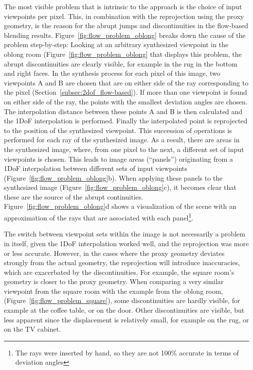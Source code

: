 The most visible problem that is intrinsic to the approach is the choice of input viewpoints per pixel. This, in combination with the reprojection using the proxy geometry, is the reason for the abrupt jumps and discontinuities in the flow-based blending results. Figure~\ref{fig:flow_problem_oblong} breaks down the cause of the problem step-by-step: Looking at an arbitrary synthesized viewpoint in the oblong room (Figure~\ref{fig:flow_problem_oblong} that displays this problem, the abrupt discontinuities are clearly visible, for example in the rug in the bottom and right faces. 
In the synthesis process for each pixel of this image, two viewpoints A and B are chosen that are on either side of the ray corresponding to the pixel (Section~\ref{subsec:2dof_flow-based}). If more than one viewpoint is found on either side of the ray, the points with the smallest deviation angles are chosen. The interpolation distance between these points A and B is then calculated and the 1DoF interpolation is performed. Finally the interpolated point is reprojected to the position of the synthesized viewpoint.
This succession of operations is performed for each ray of the synthesized image. As a result, there are areas in the synthesized image, where, from one pixel to the next, a different set of input viewpoints is chosen. This leads to image areas (``panels'') originating from a 1DoF interpolation between different sets of input viewpoints (Figure~\ref{fig:flow_problem_oblong}b). When applying these panels to the synthesized image (Figure~\ref{fig:flow_problem_oblong}c), it becomes clear that these are the source of the abrupt continuities.
Figure~\ref{fig:flow_problem_oblong}d shows a visualization of the scene with an approximation of the rays that are associated with each panel\footnote{The rays were inserted by hand, so they are not 100\% accurate in terms of deviation angles}.

The switch between viewpoint sets within the image is not necessarily a problem in itself, given the 1DoF interpolation worked well, and the reprojection was more or less accurate. However, in the cases where the proxy geometry deviates strongly from the actual geometry, the reprojection will introduce inaccuracies, which are exacerbated by the discontinuities.
For example, the square room's geometry is closer to the proxy geometry. When comparing a very similar viewpoint from the square room with the example from the oblong room, (Figure~\ref{fig:flow_problem_square}), some discontinuities are hardly visible, for example at the coffee table, or on the door. Other discontinuities are visible, but less apparent since the displacement is relatively small, for example on the rug, or on the TV cabinet.

